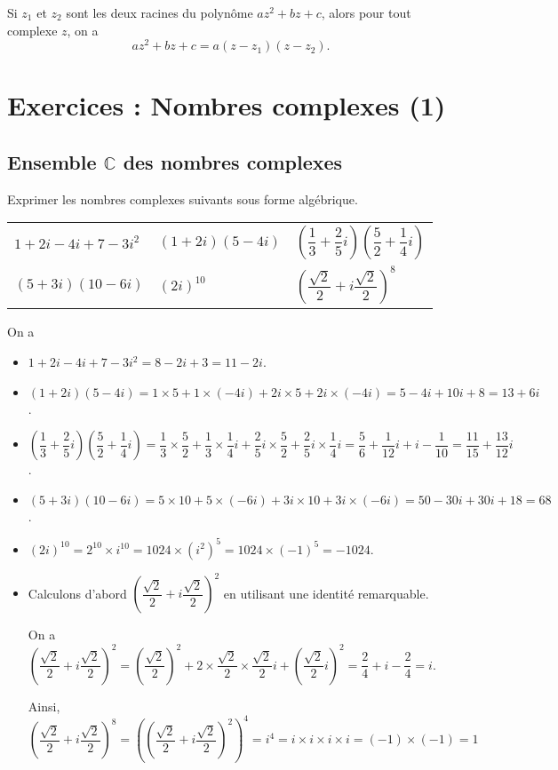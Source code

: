 \documentclass[11pt,fleqn, openany]{book} %
\begin{document}
Si $z_1$ et $z_2$ sont les deux racines du polynôme $az^2+bz+c$, alors pour tout complexe $z$, on a \[az^2+bz+c=a(z-z_1)(z-z_2).\]



\chapter{Exercices : Nombres complexes (1)}
 
\section*{Ensemble $\mathbb{C}$ des nombres complexes}



\begin{exercise}[topic=cpx01] Exprimer les nombres complexes suivants sous forme algébrique.

\begin{tabularx}{\linewidth}{XXX}
$1+2i-4i+7-3i^2$ & $(1+2i)(5-4i)$ & $\left(\dfrac{1}{3}+\dfrac{2}{5}i\right)\left(\dfrac{5}{2}+\dfrac{1}{4}i\right)$\\

$(5+3i)(10-6i)$ & $(2i)^{10}$ & $\left(\dfrac{\sqrt{2}}{2}+i \dfrac{\sqrt{2}}{2}\right)^8$

\end{tabularx}
\vspace{-1cm}\end{exercise}

\begin{solution}
On a 
\begin{itemize}
\item \(1+2i-4i+7-3i^2=8-2i+3=11-2i\).
\item \((1+2i)(5-4i)=1\times 5 + 1 \times (-4i) + 2i \times 5 +2i \times (-4i) = 5-4i+10i+8=13+6i\).
\item \(\left(\dfrac{1}{3}+\dfrac{2}{5}i\right)\left(\dfrac{5}{2}+\dfrac{1}{4}i\right)=\dfrac{1}{3} \times \dfrac{5}{2} + \dfrac{1}{3} \times \dfrac{1}{4}i+\dfrac{2}{5}i \times \dfrac{5}{2} +\dfrac{2}{5}i \times \dfrac{1}{4}i = \dfrac{5}{6}+\dfrac{1}{12}i+i-\dfrac{1}{10}=\dfrac{11}{15}+\dfrac{13}{12}i\).
\item \((5+3i)(10-6i)=5\times 10 + 5 \times(-6i)+3i \times 10 +3i \times (-6i) = 50 -30i+30i+18=68\).
\item \((2i)^{10}=2^{10} \times i^{10}=1024 \times (i^2)^5=1024 \times (-1)^5=-1024\).
\item Calculons d'abord \(\left(\dfrac{\sqrt{2}}{2}+i \dfrac{\sqrt{2}}{2}\right)^2\) en utilisant une identité remarquable.

On a \(\left(\dfrac{\sqrt{2}}{2}+i \dfrac{\sqrt{2}}{2}\right)^2 = \left(\dfrac{\sqrt{2}}{2}\right)^2 + 2 \times \dfrac{\sqrt{2}}{2} \times \dfrac{\sqrt{2}}{2}i + \left(\dfrac{\sqrt{2}}{2}i\right)^2=\dfrac{2}{4}+i-\dfrac{2}{4}=i \).

Ainsi, \(\left(\dfrac{\sqrt{2}}{2}+i \dfrac{\sqrt{2}}{2}\right)^8 = \left(\left(\dfrac{\sqrt{2}}{2}+i \dfrac{\sqrt{2}}{2}\right)^2\right)^4=i^4=i\times i \times i \times i = (-1) \times (-1) = 1\)
\end{itemize}
\end{solution}
\end{document}
